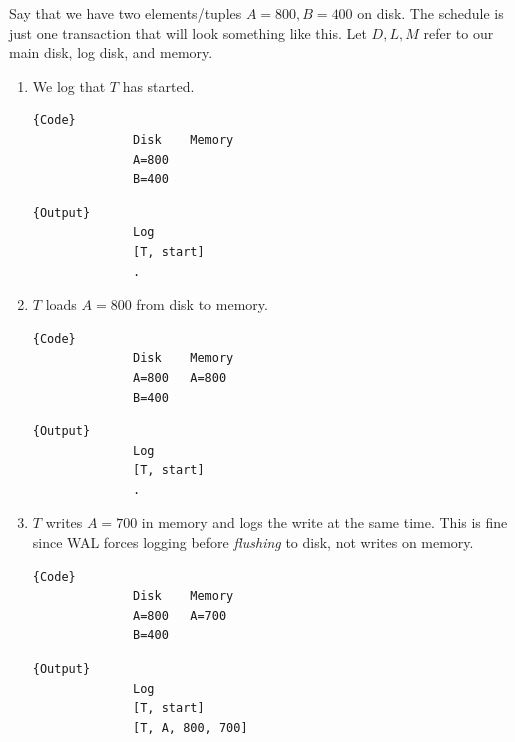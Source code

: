     \begin{example}
      Say that we have two elements/tuples $A = 800, B = 400$ on disk. The schedule is just one transaction that will look something like this. Let $D, L, M$ refer to our main disk, log disk, and memory. 
      \begin{enumerate}
        \item We log that $T$ has started. 

          \noindent\begin{minipage}{.46\textwidth}
            \begin{lstlisting}[]{Code}
              Disk    Memory
              A=800   
              B=400
            \end{lstlisting}
            \end{minipage}
            \hfill
            \begin{minipage}{.45\textwidth}
            \begin{lstlisting}[]{Output}
              Log 
              [T, start]
              .
            \end{lstlisting}
          \end{minipage}

        \item $T$ loads $A=800$ from disk to memory. 

          \noindent\begin{minipage}{.46\textwidth}
            \begin{lstlisting}[]{Code}
              Disk    Memory
              A=800   A=800
              B=400
            \end{lstlisting}
            \end{minipage}
            \hfill
            \begin{minipage}{.45\textwidth}
            \begin{lstlisting}[]{Output}
              Log 
              [T, start]
              .
            \end{lstlisting}
          \end{minipage}

        \item $T$ writes $A=700$ in memory and logs the write at the same time. This is fine since WAL forces logging before \textit{flushing} to disk, not writes on memory. 

          \noindent\begin{minipage}{.46\textwidth}
            \begin{lstlisting}[]{Code}
              Disk    Memory
              A=800   A=700
              B=400
            \end{lstlisting}
            \end{minipage}
            \hfill
            \begin{minipage}{.45\textwidth}
            \begin{lstlisting}[]{Output}
              Log 
              [T, start]
              [T, A, 800, 700]
            \end{lstlisting}
          \end{minipage}


\end{enumerate}
\end{example}
